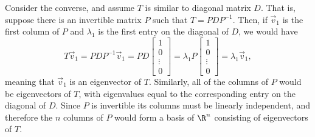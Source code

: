 \documentclass{problemset}
\newcommand{\matc}[1]{\begin{bmatrix}#1\end{bmatrix}}
\begin{document}
\begin{parts}
\begin{solution}
				Consider the converse, and assume $T$ is similar to diagonal 
				matrix $D$. That is, suppose there is an invertible matrix 
				$P$ such that $T=PDP^{-1}$. Then, if $\vec v_1$ is the first 
				column of $P$ and $\lambda_1$ is the first entry on	the diagonal
				of $D$, we would have
				\[
					T\vec v_1
					=PDP^{-1}\vec v_1
					=PD\matc{1\\0\\\vdots\\0}
					=\lambda_1P\matc{1\\0\\\vdots\\0}
					=\lambda_1\vec v_1,
				\]
				meaning that $\vec v_1$ is an eigenvector of $T$. Similarly, all
				of the columns of $P$ would be eigenvectors of $T$, with eigenvalues
				equal to the corresponding entry on the diagonal of $D$. Since $P$ is 
				invertible its columns must be linearly independent, and therefore
				the $n$ columns of $P$ would form a basis of $\R^n$ consisting of
				eigenvectors of $T$. 
			\end{solution}
	\end{parts}
\end{document}
